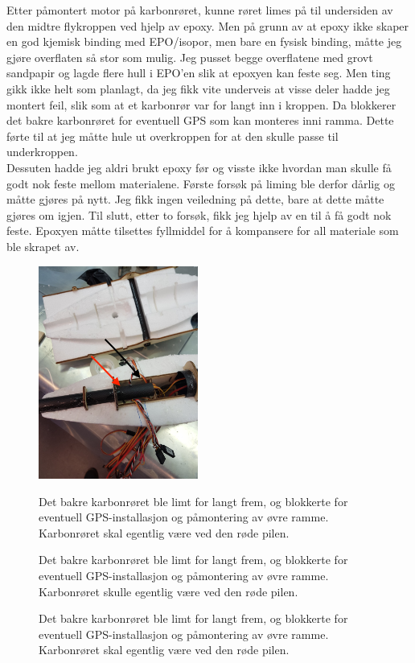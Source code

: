 \documentclass[12pt, a4paper]{article}
\begin{document}
\newpage
Etter påmontert motor på karbonrøret, kunne røret limes på til undersiden av den midtre flykroppen ved hjelp av epoxy. Men på grunn av at epoxy ikke skaper en god kjemisk binding med EPO/isopor, men bare en fysisk binding, måtte jeg gjøre overflaten så stor som mulig. Jeg pusset begge overflatene med grovt sandpapir og lagde flere hull i EPO'en slik at epoxyen kan feste seg. 
Men ting gikk ikke helt som planlagt, da jeg fikk vite underveis at visse deler hadde jeg montert feil, slik som at et karbonrør var for langt inn i kroppen. Da blokkerer det bakre karbonrøret for eventuell GPS som kan monteres inni ramma. Dette førte til at jeg måtte hule ut overkroppen for at den skulle passe til underkroppen. \\
Dessuten hadde jeg aldri brukt epoxy før og visste ikke hvordan man skulle få godt nok feste mellom materialene. Første forsøk på liming ble derfor dårlig og måtte gjøres på nytt. Jeg fikk ingen veiledning på dette, bare at dette måtte gjøres om igjen. Til slutt, etter to forsøk, fikk jeg hjelp av en til å få godt nok feste. Epoxyen måtte tilsettes fyllmiddel for å kompansere for all materiale som ble skrapet av. \\


\begin{figure}[ht]
	\centering
	\includegraphics[height = 7cm, width = .6\textwidth]{bilder/feilmontering_av_karbon_red.jpg}

	\caption[Feilliming]{Det bakre karbonrøret ble limt for langt frem, og blokkerte for eventuell GPS-installasjon og påmontering av øvre ramme. Karbonrøret skal egentlig være ved den røde pilen.}


	\caption{Det bakre karbonrøret ble limt for langt frem, og blokkerte for eventuell GPS-installasjon og påmontering av øvre ramme. Karbonrøret skulle egentlig være ved den røde pilen.}

	\caption[Feilliming]{Det bakre karbonrøret ble limt for langt frem, og blokkerte for eventuell GPS-installasjon og påmontering av øvre ramme. Karbonrøret skal egentlig være ved den røde pilen.}

\end{figure}
\end{document}
